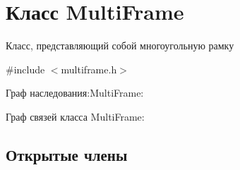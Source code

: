 \hypertarget{class_multi_frame}{}\section{Класс Multi\+Frame}
\label{class_multi_frame}


Класс, представляющий собой многоугольную рамку  




{\ttfamily \#include $<$multiframe.\+h$>$}



Граф наследования\+:Multi\+Frame\+:


Граф связей класса Multi\+Frame\+:
\subsection*{Открытые члены}
